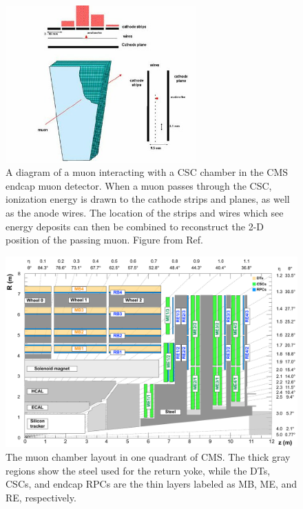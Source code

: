 \begin{figure}[htbp]
    \includegraphics[width=0.65\textwidth]{figures/cscInteractionExample.jpg}
    \centering
	\caption[A muon interacting with a CSC chamber]{A diagram of a muon interacting with a CSC chamber in the CMS endcap muon detector. When a muon passes through the CSC, ionization energy is drawn to the cathode strips and planes, as well as the anode wires. The location of the strips and wires which see energy deposits can then be combined to reconstruct the 2-D position of the passing muon. Figure from Ref.~\cite{hauser2004}}
    \label{fig:CSCInteraction}
\end{figure}

\begin{figure}[htbp]
    \includegraphics[width=\textwidth]{figures/cms_quadrant_run_ii.pdf}
    \centering
    \caption[Muon chamber layout in Run 2]{The muon chamber layout in one quadrant of CMS. The thick gray regions show the steel used for the return yoke, while the DTs, CSCs, and endcap RPCs are the thin layers labeled as MB, ME, and RE, respectively.}
    \label{fig:cscLayout}
\end{figure}

